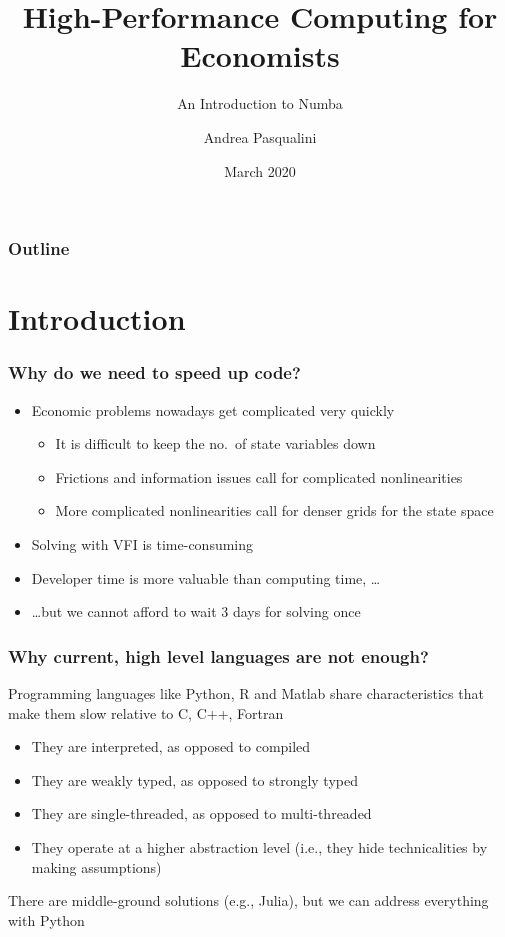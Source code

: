 \documentclass[10pt, aspectratio=1610]{beamer}
\author{Andrea Pasqualini}
\institute{Bocconi University}
\date{March 2020}
\title{High-Performance Computing for Economists}
\subtitle{An Introduction to Numba}
\begin{document}
\maketitle

\begin{frame}
  \frametitle{Outline}

  \tableofcontents

\end{frame}

\section{Introduction}

\begin{frame}
  \frametitle{Why do we need to speed up code?}

  \begin{itemize}
    \item
      Economic problems nowadays get complicated very quickly
      \begin{itemize}
        \item
          It is difficult to keep the no.~of state variables down
        \item
          Frictions and information issues call for complicated nonlinearities
        \item
          More complicated nonlinearities call for denser grids for the state space
      \end{itemize}
    \item
      Solving with VFI is time-consuming
    \item
      Developer time is more valuable than computing time, \ldots
    \item
      \ldots but we cannot afford to wait 3 days for solving once
  \end{itemize}

\end{frame}

\begin{frame}
  \frametitle{Why current, high level languages are not enough?}

  Programming languages like Python, R and Matlab share characteristics that make them slow relative to C, C++, Fortran

  \begin{itemize}
    \item They are interpreted, as opposed to compiled
    \item They are weakly typed, as opposed to strongly typed
    \item They are single-threaded, as opposed to multi-threaded
    \item They operate at a higher abstraction level (i.e., they hide technicalities by making assumptions)
  \end{itemize}

  There are middle-ground solutions (e.g., Julia), but we can address everything with Python

\end{frame}
\end{document}
